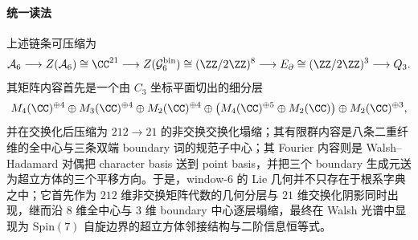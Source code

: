 \paragraph{统一读法}
上述链条可压缩为
\[
\mathcal A_6
\longrightarrow
Z(\mathcal A_6)\cong \CC^{21}
\longrightarrow
Z(\mathcal G_6^{\mathrm{bin}})\cong (\ZZ/2\ZZ)^8
\longrightarrow
E_{\partial}\cong (\ZZ/2\ZZ)^3
\longrightarrow
Q_3.
\]
其矩阵内容首先是一个由 \(C_3\) 坐标平面切出的细分层
\[
M_4(\CC)^{\oplus 4}\oplus M_3(\CC)^{\oplus 4}\oplus M_2(\CC)^{\oplus 4}\oplus \bigl(M_4(\CC)^{\oplus 5}\oplus M_2(\CC)\bigr)\oplus M_2(\CC)^{\oplus 3},
\]
并在交换化后压缩为 \(212\to 21\) 的非交换交换化塌缩；其有限群内容是八条二重纤维的全中心与三条双端 boundary 词的规范子中心；其 Fourier 内容则是 Walsh--Hadamard 对偶把 character basis 送到 point basis，并把三个 boundary 生成元送为超立方体的三个平移方向。于是，window-\(6\) 的 Lie 几何并不只存在于根系字典之中；它首先作为 \(212\) 维非交换矩阵代数的几何分层与 \(21\) 维交换化阴影同时出现，继而沿 \(8\) 维全中心与 \(3\) 维 boundary 中心逐层塌缩，最终在 Walsh 光谱中显现为 \(\mathrm{Spin}(7)\) 自旋边界的超立方体邻接结构与二阶信息恒等式。

\endinput
